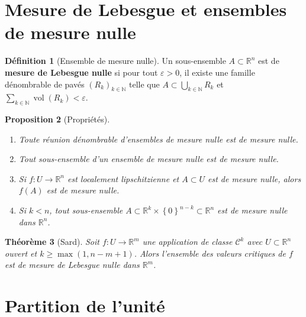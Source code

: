\documentclass[12pt,a4paper,openany]{book}
\theoremstyle{definition}
\newtheorem{definition}{Définition}[chapter]
\theoremstyle{plain}
\newtheorem{theoreme}[definition]{Théorème}
\newtheorem{proposition}[definition]{Proposition}
\theoremstyle{remark}
\newcommand{\N}{\mathbb{N}}
\newcommand{\R}{\mathbb{R}}
\newcommand{\set}[1]{\left\{#1\right\}}
\begin{document}
\section{Mesure de Lebesgue et ensembles de mesure nulle}\label{app:lebesgue}

\begin{definition}[Ensemble de mesure nulle]\label{def:app-mesure-nulle}
Un sous-ensemble $A \subset \R^n$ est de \textbf{mesure de Lebesgue nulle} si
pour tout $\varepsilon > 0$, il existe une famille dénombrable de pavés
$(R_k)_{k \in \N}$ telle que $A \subset \bigcup_{k \in \N} R_k$ et
$\sum_{k \in \N} \operatorname{vol}(R_k) < \varepsilon$.
\end{definition}

\begin{proposition}[Propriétés]\label{prop:app-mesure-nulle}
\begin{enumerate}[label=(\roman*)]
  \item Toute réunion dénombrable d'ensembles de mesure nulle est de mesure nulle.
  \item Tout sous-ensemble d'un ensemble de mesure nulle est de mesure nulle.
  \item Si $f : U \to \R^n$ est localement lipschitzienne et $A \subset U$ est de
    mesure nulle, alors $f(A)$ est de mesure nulle.
  \item Si $k < n$, tout sous-ensemble $A \subset \R^k \times \set{0}^{n-k} \subset \R^n$
    est de mesure nulle dans $\R^n$.
\end{enumerate}
\end{proposition}

\begin{theoreme}[Sard]\label{thm:app-sard}
Soit $f : U \to \R^m$ une application de classe $\mathcal{C}^k$ avec
$U \subset \R^n$ ouvert et $k \geqslant \max(1, n - m + 1)$. Alors l'ensemble
des valeurs critiques de $f$ est de mesure de Lebesgue nulle dans $\R^m$.
\end{theoreme}

\section{Partition de l'unité}\label{app:partition}
\end{document}
